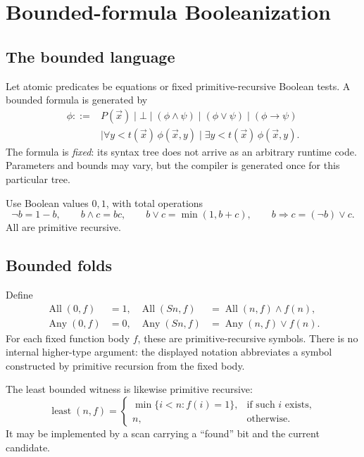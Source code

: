 \section{Bounded-formula Booleanization}
\label{sec:booleanization}

\subsection{The bounded language}

Let atomic predicates be equations or fixed primitive-recursive Boolean tests.
A bounded formula is generated by
\[
\begin{aligned}
\phi ::= {}& P(\vec x)\mid \bot\mid
(\phi\wedge\psi)\mid(\phi\vee\psi)\mid(\phi\to\psi)\\
&\mid \forall y<t(\vec x)\,\phi(\vec x,y)
\mid \exists y<t(\vec x)\,\phi(\vec x,y).
\end{aligned}
\]
The formula is \emph{fixed}: its syntax tree does not arrive as an arbitrary
runtime code.  Parameters and bounds may vary, but the compiler is generated
once for this particular tree.

Use Boolean values \(0,1\), with total operations
\[
  \neg b=1-b,\qquad
  b\wedge c=bc,
  \qquad
  b\vee c=\min(1,b+c),
  \qquad
  b\Rightarrow c=(\neg b)\vee c.
\]
All are primitive recursive.

\subsection{Bounded folds}

Define
\begin{align*}
 \operatorname{All}(0,f)&=1,
 &\operatorname{All}(Sn,f)&=
    \operatorname{All}(n,f)\wedge f(n),\\
 \operatorname{Any}(0,f)&=0,
 &\operatorname{Any}(Sn,f)&=
    \operatorname{Any}(n,f)\vee f(n).
\end{align*}
For each fixed function body \(f\), these are primitive-recursive symbols.
There is no internal higher-type argument: the displayed notation abbreviates
a symbol constructed by primitive recursion from the fixed body.

The least bounded witness is likewise primitive recursive:
\[
 \operatorname{least}(n,f)=
 \begin{cases}
  \min\{i<n:f(i)=1\},&\text{if such }i\text{ exists},\\
  n,&\text{otherwise}.
 \end{cases}
\]
It may be implemented by a scan carrying a ``found'' bit and the current
candidate.

